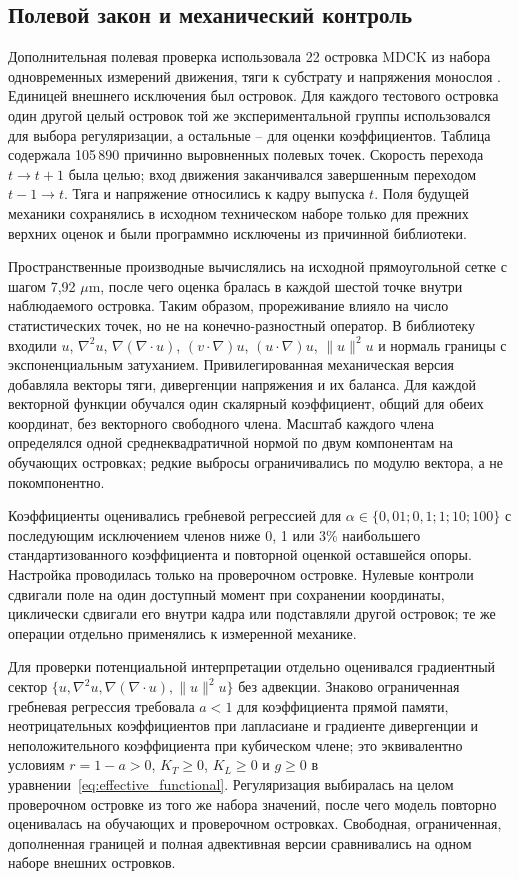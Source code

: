 \documentclass[11pt,a4paper]{article}
\begin{document}
\subsection{Полевой закон и механический контроль}
Дополнительная полевая проверка использовала 22 островка MDCK из набора одновременных измерений движения, тяги к субстрату и напряжения монослоя \cite{ref24}. Единицей внешнего исключения был островок. Для каждого тестового островка один другой целый островок той же экспериментальной группы использовался для выбора регуляризации, а остальные -- для оценки коэффициентов. Таблица содержала 105\,890 причинно выровненных полевых точек. Скорость перехода $t\rightarrow t+1$ была целью; вход движения заканчивался завершенным переходом $t-1\rightarrow t$. Тяга и напряжение относились к кадру выпуска $t$. Поля будущей механики сохранялись в исходном техническом наборе только для прежних верхних оценок и были программно исключены из причинной библиотеки.

Пространственные производные вычислялись на исходной прямоугольной сетке с шагом 7,92 $\mu$m, после чего оценка бралась в каждой шестой точке внутри наблюдаемого островка. Таким образом, прореживание влияло на число статистических точек, но не на конечно-разностный оператор. В библиотеку входили $u$, $\nabla^2u$, $\nabla(\nabla\!\cdot u)$, $(v\!\cdot\nabla)u$, $(u\!\cdot\nabla)u$, $\|u\|^2u$ и нормаль границы с экспоненциальным затуханием. Привилегированная механическая версия добавляла векторы тяги, дивергенции напряжения и их баланса. Для каждой векторной функции обучался один скалярный коэффициент, общий для обеих координат, без векторного свободного члена. Масштаб каждого члена определялся одной среднеквадратичной нормой по двум компонентам на обучающих островках; редкие выбросы ограничивались по модулю вектора, а не покомпонентно.

Коэффициенты оценивались гребневой регрессией для $\alpha\in\{0{,}01;0{,}1;1;10;100\}$ с последующим исключением членов ниже 0, 1 или 3\% наибольшего стандартизованного коэффициента и повторной оценкой оставшейся опоры. Настройка проводилась только на проверочном островке. Нулевые контроли сдвигали поле на один доступный момент при сохранении координаты, циклически сдвигали его внутри кадра или подставляли другой островок; те же операции отдельно применялись к измеренной механике.

Для проверки потенциальной интерпретации отдельно оценивался градиентный сектор $\{u,\nabla^2u,\nabla(\nabla\!\cdot u),\|u\|^2u\}$ без адвекции. Знаково ограниченная гребневая регрессия требовала $a<1$ для коэффициента прямой памяти, неотрицательных коэффициентов при лапласиане и градиенте дивергенции и неположительного коэффициента при кубическом члене; это эквивалентно условиям $r=1-a>0$, $K_T\geq0$, $K_L\geq0$ и $g\geq0$ в уравнении~\eqref{eq:effective_functional}. Регуляризация выбиралась на целом проверочном островке из того же набора значений, после чего модель повторно оценивалась на обучающих и проверочном островках. Свободная, ограниченная, дополненная границей и полная адвективная версии сравнивались на одном наборе внешних островков.
\end{document}
